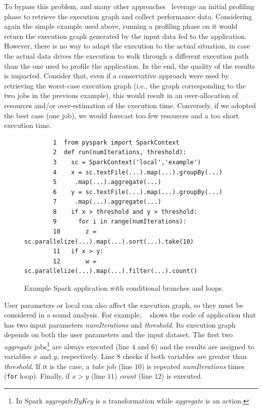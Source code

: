 To bypass this problem, \cSpark and many other approaches~\cite{Sidhanta2016, dSpark} leverage  an initial profiling phase to retrieve the execution graph and collect performance data. Considering again the simple example used above, running a profiling phase on it would return the execution graph generated by the input data fed to the application. However, there is no way to adapt the execution to the actual situation, in case the actual data drives the execution to walk through a different execution path than the one used to profile the application. In the end, the  quality of the results is impacted. Consider that, even if a conservative approach were used by retrieving the worst-case execution graph (i.e., the graph corresponding to the two jobs in the previous example), this would result in an over-allocation of resources and/or over-estimation of the execution time. Conversely, if we adopted the best case (one job), we would forecast too few resources and a too short execution time.

\begin{figure}[htbp]
	\begin{small}
		\begin{verbatim}
		1  from pyspark import SparkContext
		2  def run(numIterations, threshold):
		3    sc = SparkContext('local','example')
		4  	 x = sc.textFile(...).map(...).groupBy(...)
		5     .map(...).aggregate(...)
		6    y = sc.textFile(...).map(...).groupBy(...)
		7     .map(...).aggregate(...)
		8    if x > threshold and y > threshold:
		9      for i in range(numIterations):
		10       z = sc.parallelize(...).map(...).sort(...).take(10)
		11   if x > y:
		12       w = sc.parallelize(...).map(...).filter(...).count()
		\end{verbatim}
	\end{small}
	\caption{Example Spark application with conditional branches and loops.}
	\label{fig:xdag2-code}
\end{figure}


User parameters or local can also affect the execution graph, so they must be considered in a sound analysis. For example, ~ shows the code of application that has two input parameters \textit{numIterations} and \textit{threshold}. Its execution graph depends on both the user parameters and the input dataset. The first two \textit{aggregate} jobs\footnote{In Spark \textit{aggregateByKey} is a transformation while \textit{aggregate} is an action.} are always executed (line $4$ and $6$) and the results are assigned to variables $x$ and $y$, respectively. Line $8$ checks if both variables are greater than \textit{threshold}. If it is the case, a \textit{take} job (line $10$) is repeated \textit{numIterations} times (\verb#for# loop). Finally, if $x > y$ (line $11$) \textit{count} (line $12$) is executed. 

